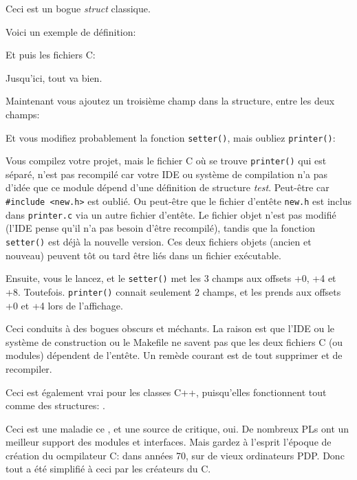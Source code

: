 
Ceci est un bogue \emph{struct} classique.

Voici un exemple de définition:



Et puis les fichiers C:





Jusqu'ici, tout va bien.

Maintenant vous ajoutez un troisième champ dans la structure, entre les deux champs:



Et vous modifiez probablement la fonction \verb|setter()|, mais oubliez \verb|printer()|:



Vous compilez votre projet, mais le fichier C où se trouve \verb|printer()| qui
est séparé, n'est pas recompilé car votre \ac{IDE} ou système de compilation n'a
pas d'idée que ce module dépend d'une définition de structure \emph{test}.
Peut-être car \verb|#include <new.h>| est oublié.
Ou peut-être que le fichier d'entête \verb|new.h| est inclus dans \verb|printer.c|
via un autre fichier d'entête.
Le fichier objet n'est pas modifié (l'\ac{IDE} pense qu'il n'a pas besoin d'être
recompilé), tandis que la fonction \verb|setter()| est déjà la nouvelle version.
Ces deux fichiers objets (ancien et nouveau) peuvent tôt ou tard être liés dans un
fichier exécutable.

Ensuite, vous le lancez, et le \verb|setter()| met les 3 champs aux offsets +0,
+4 et +8.
Toutefois. \verb|printer()| connait seulement 2 champs, et les prends aux offsets
+0 et +4 lors de l'affichage.

Ceci conduits à des bogues obscurs et méchants.
La raison est que l'\ac{IDE} ou le système de construction ou le Makefile ne savent
pas que les deux fichiers C (ou modules) dépendent de l'entête.
Un remède courant est de tout supprimer et de recompiler.

Ceci est également vrai pour les classes C++, puisqu'elles fonctionnent tout comme
des structures: .

Ceci est une maladie ce \CCpp, et une source de critique, oui.
De nombreux \ac{PL}s ont un meilleur support des modules et interfaces.
Mais gardez à l'esprit l'époque de création du ocmpilateur C: dans années 70,
sur de vieux ordinateurs PDP.
Donc tout a été simplifié à ceci par les créateurs du C.
